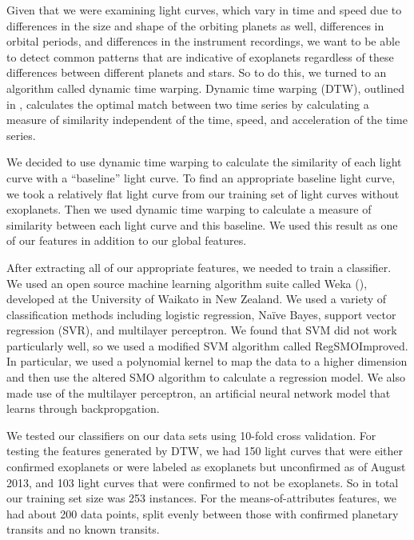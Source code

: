 \documentclass{amsart}
\begin{document}
Given that we were examining light curves, which vary in time and speed due to differences in the size and shape of the orbiting planets as well, differences in orbital periods, and differences in the instrument recordings, we want to be able to detect common patterns that are indicative of exoplanets regardless of these differences between different planets and stars. So to do this, we turned to an algorithm called dynamic time warping. Dynamic time warping (DTW), outlined in \cite{dtw}, calculates the optimal match between two time series by calculating a measure of similarity independent of the time, speed, and acceleration of the time series. 

We decided to use dynamic time warping to calculate the similarity of each light curve with a ``baseline'' light curve. To find an appropriate baseline light curve, we took a relatively flat light curve from our training set of light curves without exoplanets. Then we used dynamic time warping to calculate a measure of similarity between each light curve and this baseline. We used this result as one of our features in addition to our global features.

After extracting all of our appropriate features, we needed to train a classifier. We used an open source machine learning algorithm suite called Weka (\cite{Weka}), developed at the University of Waikato in New Zealand. We used a variety of classification methods including logistic regression, Na\"ive Bayes, support vector regression (SVR), and multilayer perceptron. We found that SVM did not work particularly well, so we used a modified SVM algorithm called RegSMOImproved\cite{SMOreg}. In particular, we used a polynomial kernel to map the data to a higher dimension and then use the altered SMO algorithm to calculate a regression model. We also made use of the multilayer perceptron, an artificial neural network model that learns through backpropgation. 

We tested our classifiers on our data sets using 10-fold cross validation. For testing the features generated by DTW, we had 150 light curves that were either confirmed exoplanets or were labeled as exoplanets but unconfirmed as of August 2013, and 103 light curves that were confirmed to not be exoplanets. So in total our training set size was 253 instances. For the means-of-attributes features, we had about 200 data points, split evenly between those with confirmed planetary transits and no known transits.
\end{document}
